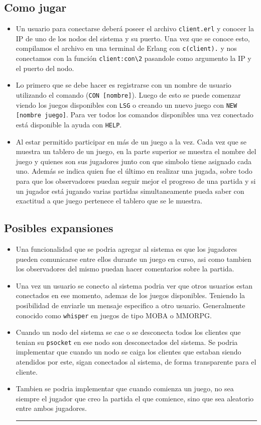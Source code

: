 \documentclass[a4paper]{article}
\newcommand{\blacktr}[0]{\item[$\blacktriangleright$]}
\begin{document}
\subsection*{Como jugar}
\begin{itemize}
   \blacktr Un usuario para conectarse deberá poseer el archivo \texttt{client.erl} y conocer la IP de uno de los nodos del sistema y su puerto. Una vez que se conoce esto, compilamos el archivo en una terminal de Erlang con \texttt{c(client).} y nos conectamos con la función \texttt{client:con\textbackslash2} pasandole como argumento la IP y el puerto del nodo. 
  
  \blacktr Lo primero que se debe hacer es registrarse con un nombre de usuario utilizando el comando (\texttt{CON [nombre]}). Luego de esto se puede comenzar viendo los juegos disponibles con \texttt{LSG} o creando un nuevo juego con \texttt{NEW [nombre juego]}. Para ver todos los comandos disponibles una vez conectado está disponible la ayuda con \texttt{HELP}.

  \blacktr Al estar permitido participar en más de un juego a la vez. Cada vez que se muestra un tablero de un juego, en la parte superior se muestra el nombre del juego y quienes son sus jugadores junto con que simbolo tiene asignado cada uno. Además se indica quien fue el último en realizar una jugada, sobre todo para que los observadores puedan seguir mejor el progreso de una partida y si un jugador está jugando varias partidas simultaneamente pueda saber con exactitud a que juego pertenece el tablero que se le muestra.
\end{itemize}

\subsection*{Posibles expansiones}
\begin{itemize}
  \blacktr Una funcionalidad que se podria agregar al sistema es que los jugadores pueden comunicarse entre ellos durante un juego en curso, asi como tambien los observadores del mismo puedan hacer comentarios sobre la partida.

  \blacktr Una vez un usuario se conecto al sistema podria ver que otros usuarios estan conectados en ese momento, ademas de los juegos disponibles. Teniendo la posibilidad de enviarle un mensaje especifico a otro usuario. Generalmente conocido como \texttt{whisper} en juegos de tipo MOBA o MMORPG.

  \blacktr Cuando un nodo del sistema se cae o se desconecta todos los clientes que tenian su \texttt{psocket} en ese nodo son desconectados del sistema. Se podria implementar que cuando un nodo se caiga los clientes que estaban siendo atendidos por este, sigan conectados al sistema, de forma transparente para el cliente.

  \blacktr Tambien se podria implementar que cuando comienza un juego, no sea siempre el jugador que creo la partida el que comience, sino que sea aleatorio entre ambos jugadores.

\rule{18cm}{0.4pt}
\end{itemize}
\end{document}
